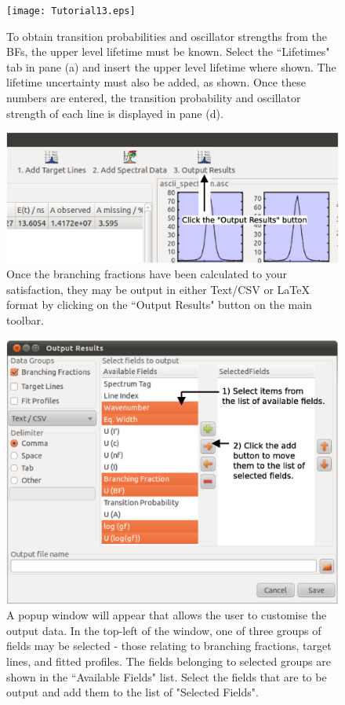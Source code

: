 \documentclass[a4paper,12pt]{report}
\begin{document}
\begin{figure}\centering
\texttt{[image: Tutorial13.eps]}
\caption{To obtain transition probabilities and oscillator strengths from the BFs, the upper level lifetime must be known. Select the ``Lifetimes" tab in pane (a) and insert the upper level lifetime where shown. The lifetime uncertainty must also be added, as shown. Once these numbers are entered, the transition probability and oscillator strength of each line is displayed in pane (d).}
\label{fig:tut13}
\end{figure}

\begin{figure}\centering
\includegraphics[scale=0.37]{Tutorial14.eps}
\caption{Once the branching fractions have been calculated to your satisfaction, they may be output in either Text/CSV or LaTeX format by clicking on the ``Output Results" button on the main toolbar.}
\label{fig:tut14}
\end{figure}

\begin{figure}\centering
\includegraphics[scale=0.45]{Tutorial15.eps}
\caption{A popup window will appear that allows the user to customise the output data. In the top-left of the window, one of three groups of fields may be selected - those relating to branching fractions, target lines, and fitted profiles. The fields belonging to selected groups are shown in the ``Available Fields" list. Select the fields that are to be output and add them to the list of "Selected Fields".}
\label{fig:tut15}
\end{figure}
\end{document}
